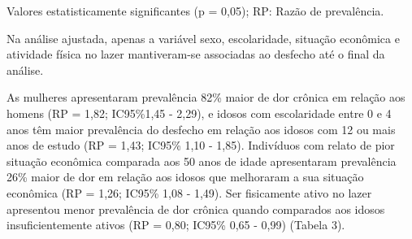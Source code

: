 \documentclass{article}
\begin{document}
Valores estatisticamente significantes (p = 0,05); RP: Razão de prevalência.

Na análise ajustada, apenas a variável sexo, escolaridade, situação econômica e
atividade física no lazer mantiveram-se associadas ao desfecho até o final da
análise.

As mulheres apresentaram prevalência 82\% maior de dor crônica em relação aos
homens (RP = 1,82; IC95\%1,45 - 2,29), e idosos com escolaridade entre 0 e 4
anos têm maior prevalência do desfecho em relação aos idosos com 12 ou mais anos
de estudo (RP = 1,43; IC95\% 1,10 - 1,85). Indivíduos com relato de pior
situação econômica comparada aos 50 anos de idade apresentaram prevalência 26\%
maior de dor em relação aos idosos que melhoraram a sua situação econômica (RP =
1,26; IC95\% 1,08 - 1,49). Ser fisicamente ativo no lazer apresentou menor
prevalência de dor crônica quando comparados aos idosos insuficientemente ativos
(RP = 0,80; IC95\% 0,65 - 0,99) (Tabela 3).
\end{document}
